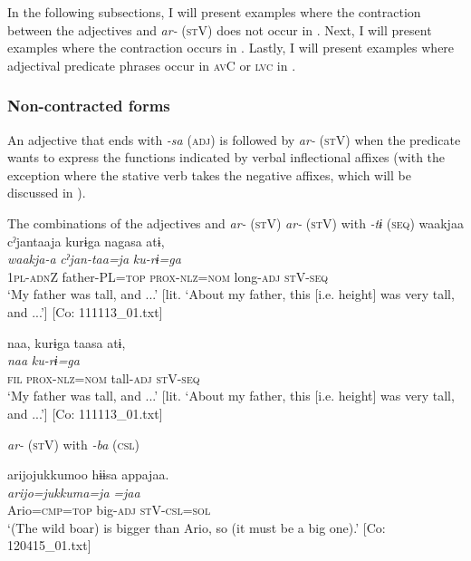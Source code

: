   In the following subsections, I will present examples where the contraction between the adjectives and \textit{ar-} (\textsc{st}V) does not occur in . Next, I will present examples where the contraction occurs in . Lastly, I will present examples where adjectival predicate phrases occur in \textsc{av}C or \textsc{lvc} in .

\subsubsection{Non-contracted forms}\label{sec:9.2.2.1}
\label{bkm:Ref361739107}
An adjective that ends with \textit{{}-sa} (\textsc{adj}) is followed by \textit{ar-} (\textsc{st}V) when the predicate wants to express the functions indicated by verbal inflectional affixes (with the exception where the stative verb takes the negative affixes, which will be discussed in ).

\ea   The combinations of the adjectives and \textit{ar-} (\textsc{st}V) \label{ex:9.45}
\exi{}  \textit{ar-} (\textsc{st}V) with \textit{{}-tɨ} (\textsc{seq})
\ea %
 \glll  waakjaa  cˀjantaaja  kurɨga  nagasa  atɨ,\\
      \textit{waakja-a}  \textit{cˀjan-taa=ja}  \textit{ku-rɨ=ga}  \textit{}  \textit{}\\
      1\textsc{pl}-\textsc{adn}Z  father-PL=\textsc{top}  \textsc{prox}-\textsc{nlz}=\textsc{nom}  long-\textsc{adj}  \textsc{st}V-\textsc{seq}\\
      \glt       ‘My father was tall, and ...’ [lit. ‘About my father, this [i.e. height] was very tall, and ...’] [Co: 111113\_01.txt]

\ex \label{ex:9.45b} %
    \glll  naa,  kurɨga  taasa  atɨ,\\
      \textit{naa}  \textit{ku-rɨ=ga}  \textit{}  \textit{}\\
      \textsc{fil}  \textsc{prox}-\textsc{nlz}=\textsc{nom}  tall-\textsc{adj}  \textsc{st}V-\textsc{seq}\\
      \glt       ‘My father was tall, and ...’ [lit. ‘About my father, this [i.e. height] was very tall, and ...’] [Co: 111113\_01.txt]

\exi{} \textit{ar-} (\textsc{st}V) with \textit{{}-ba} (\textsc{csl})

\ex \label{ex:9.45c} %
    \glll  arijojukkumoo  hɨɨsa  appajaa.\\
      \textit{arijo=jukkuma=ja}  \textit{}  \textit{=jaa}\\
      Ario=\textsc{cmp}=\textsc{top}  big-\textsc{adj}  \textsc{st}V-\textsc{csl}=\textsc{sol}\\
      \glt       ‘(The wild boar) is bigger than Ario, so (it must be a big one).’ [Co: 120415\_01.txt]

